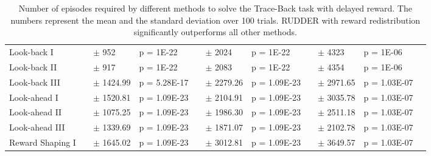 \documentclass{article}
\begin{document}
\begin{appendices}
\newpage
\begin{landscape}
\begin{table}[htp]
\begin{center}
\caption{Number of episodes required by different 
 methods to solve the Trace-Back task with delayed reward. The numbers represent the  
 mean and the standard deviation over 100 trials.
 RUDDER with reward redistribution significantly outperforms all other methods.
}
\label{tab:Ares1}\begin{tabular}{*{1}{>{\raggedright}p{14em}}*{1}{>{\columncolor{mColor1}\raggedleft}p{4em}}*{1}{>{\columncolor{mColor1}\raggedleft}p{5em}}*{1}{>{\columncolor{mColor1}\raggedright}p{5em}}*{1}{>{\raggedleft}p{4em}}*{1}{>{\raggedleft}p{5em}}*{1}{>{\raggedright}p{5em}}*{1}{>{\columncolor{mColor1}\raggedleft}p{4em}}*{1}{>{\columncolor{mColor1}\raggedleft}p{5em}}*{1}{>{\columncolor{mColor1}\raggedright}p{5em}}*{1}{>{\raggedright}p{0.01em}}}
\toprule[1pt]
\addlinespace[2pt]
{\bf Method} &\multicolumn{3}{c}{\bf Delay 6} &\multicolumn{3}{c}{\bf Delay 8} &\multicolumn{3}{c}{\bf Delay 10} &\\
\toprule[1pt]
Look-back I & 6074 & {\small $\pm$ 952} & {\small p = 1E-22} & 13112 & {\small $\pm$ 2024} & {\small p = 1E-22} & 21715 & {\small $\pm$ 4323} & {\small p = 1E-06} &  \\
Look-back II & 4584 & {\small $\pm$ 917} & {\small p = 1E-22} & 9897 & {\small $\pm$ 2083} & {\small p = 1E-22} & 15973 & {\small $\pm$ 4354} & {\small p = 1E-06} &  \\
Look-back III & 4036.48 & {\small $\pm$ 1424.99} & {\small p = 5.28E-17} & 7812.72 & {\small $\pm$ 2279.26} & {\small p = 1.09E-23} & 10982.40 & {\small $\pm$ 2971.65} & {\small p = 1.03E-07} &  \\
Look-ahead I & 14469.10 & {\small $\pm$ 1520.81} & {\small p = 1.09E-23} & 28559.32 & {\small $\pm$ 2104.91} & {\small p = 1.09E-23} & 46650.20 & {\small $\pm$ 3035.78} & {\small p = 1.03E-07} &  \\
Look-ahead II & 12623.42 & {\small $\pm$ 1075.25} & {\small p = 1.09E-23} & 24811.62 & {\small $\pm$ 1986.30} & {\small p = 1.09E-23} & 43089.00 & {\small $\pm$ 2511.18} & {\small p = 1.03E-07} &  \\
Look-ahead III & 16050.30 & {\small $\pm$ 1339.69} & {\small p = 1.09E-23} & 30732.00 & {\small $\pm$ 1871.07} & {\small p = 1.09E-23} & 50340.00 & {\small $\pm$ 2102.78} & {\small p = 1.03E-07} &  \\
Reward Shaping I & 14686.12 & {\small $\pm$ 1645.02} & {\small p = 1.09E-23} & 28223.94 & {\small $\pm$ 3012.81} & {\small p = 1.09E-23} & 46706.50 & {\small $\pm$ 3649.57} & {\small p = 1.03E-07} &  \\

\end{tabular}
\end{center}
\end{table}
\end{landscape}
\end{appendices}
\end{document}
